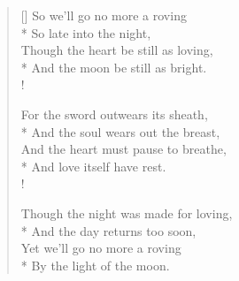 \documentclass[MAIN]{subfiles}
\begin{document}
\settowidth{\versewidth}{So we'll go no more a-roving}
\begin{verse}[\versewidth]
So we'll go no more a roving\\*
\vin So late into the night,\\
Though the heart be still as loving,\\*
\vin And the moon be still as bright.\\!

For the sword outwears its sheath,\\*
\vin And the soul wears out the breast,\\
And the heart must pause to breathe,\\*
\vin And love itself have rest.\\!

Though the night was made for loving,\\*
\vin And the day returns too soon,\\
Yet we'll go no more a roving\\*
\vin By the light of the moon.
\end{verse}
\end{document}
